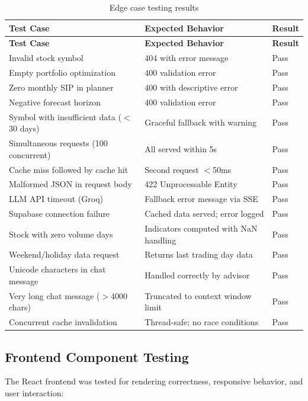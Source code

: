 \documentclass[12pt, a4paper, oneside]{report}
\begin{document}
\begin{longtable}{@{}l l l@{}}
\caption{Edge case testing results} \label{tab:edge_cases} \\
\toprule
\textbf{Test Case} & \textbf{Expected Behavior} & \textbf{Result} \\
\midrule
\endfirsthead
\toprule
\textbf{Test Case} & \textbf{Expected Behavior} & \textbf{Result} \\
\midrule
\endhead
Invalid stock symbol & 404 with error message & Pass \\
Empty portfolio optimization & 400 validation error & Pass \\
Zero monthly SIP in planner & 400 with descriptive error & Pass \\
Negative forecast horizon & 400 validation error & Pass \\
Symbol with insufficient data ($<$30 days) & Graceful fallback with warning & Pass \\
Simultaneous requests (100 concurrent) & All served within 5s & Pass \\
Cache miss followed by cache hit & Second request $<$50ms & Pass \\
Malformed JSON in request body & 422 Unprocessable Entity & Pass \\
LLM API timeout (Groq) & Fallback error message via SSE & Pass \\
Supabase connection failure & Cached data served; error logged & Pass \\
Stock with zero volume days & Indicators computed with NaN handling & Pass \\
Weekend/holiday data request & Returns last trading day data & Pass \\
Unicode characters in chat message & Handled correctly by advisor & Pass \\
Very long chat message ($>$4000 chars) & Truncated to context window limit & Pass \\
Concurrent cache invalidation & Thread-safe; no race conditions & Pass \\
\bottomrule
\end{longtable}

\subsection{Frontend Component Testing}

The React frontend was tested for rendering correctness, responsive behavior, and user interaction:
\end{document}
